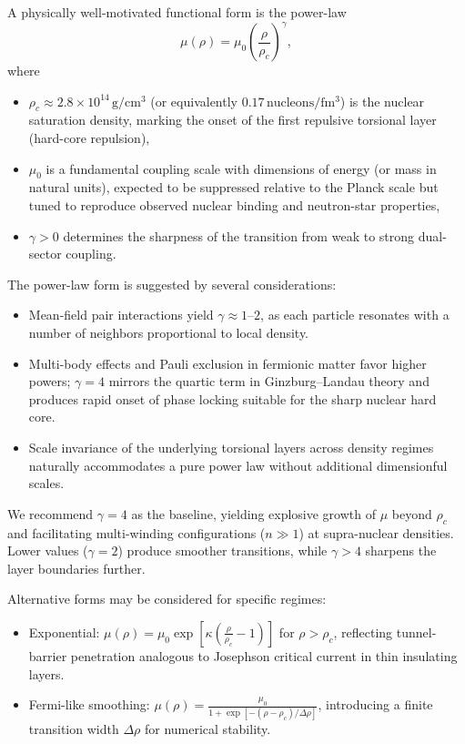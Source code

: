 \documentclass[a4paper]{article}
\begin{document}
A physically well-motivated functional form is the power-law
\[
\mu(\rho) = \mu_0 \left( \frac{\rho}{\rho_c} \right)^\gamma,
\]
where
\begin{itemize}
  \item $\rho_c \approx 2.8 \times 10^{14} \, \mathrm{g/cm^3}$ (or equivalently $0.17 \, \mathrm{nucleons/fm^3}$) is the nuclear saturation density, marking the onset of the first repulsive torsional layer (hard-core repulsion),
  \item $\mu_0$ is a fundamental coupling scale with dimensions of energy (or mass in natural units), expected to be suppressed relative to the Planck scale but tuned to reproduce observed nuclear binding and neutron-star properties,
  \item $\gamma > 0$ determines the sharpness of the transition from weak to strong dual-sector coupling.
\end{itemize}

The power-law form is suggested by several considerations:
\begin{itemize}
  \item Mean-field pair interactions yield $\gamma \approx 1$--$2$, as each particle resonates with a number of neighbors proportional to local density.
  \item Multi-body effects and Pauli exclusion in fermionic matter favor higher powers; $\gamma = 4$ mirrors the quartic term in Ginzburg--Landau theory and produces rapid onset of phase locking suitable for the sharp nuclear hard core.
  \item Scale invariance of the underlying torsional layers across density regimes naturally accommodates a pure power law without additional dimensionful scales.
\end{itemize}

We recommend $\gamma = 4$ as the baseline, yielding explosive growth of $\mu$ beyond $\rho_c$ and facilitating multi-winding configurations ($n \gg 1$) at supra-nuclear densities. Lower values ($\gamma = 2$) produce smoother transitions, while $\gamma > 4$ sharpens the layer boundaries further.

Alternative forms may be considered for specific regimes:
\begin{itemize}
  \item Exponential: $\mu(\rho) = \mu_0 \exp\!\left[ \kappa \left( \frac{\rho}{\rho_c} - 1 \right) \right]$ for $\rho > \rho_c$, reflecting tunnel-barrier penetration analogous to Josephson critical current in thin insulating layers.
  \item Fermi-like smoothing: $\mu(\rho) = \frac{\mu_0}{1 + \exp\!\left[ -(\rho - \rho_c)/\Delta\rho \right]}$, introducing a finite transition width $\Delta\rho$ for numerical stability.
\end{itemize}
\end{document}
